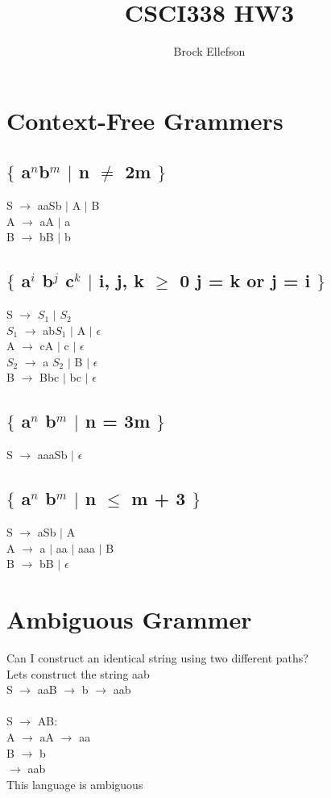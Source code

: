 \documentclass[10pt,a4paper]{article}
\author{Brock Ellefson}
\title{CSCI338 HW3}
\begin{document}
\maketitle

\section{Context-Free Grammers}
\subsection{$\lbrace$ a$^{n}$b$^{m}$ $\mid$ n $\neq$ 2m $\rbrace$}
	S $\rightarrow$ aaSb $\mid$ A $\mid$ B \\
	A $\rightarrow$ aA $\mid$ a \\
	B $\rightarrow$ bB $\mid$ b
	
\subsection{$\lbrace$ a$^{i}$ b$^{j}$ c$^{k}$ $\mid$ i, j, k $\geq$ 0 j = k or j = i $\rbrace$}
	S $\rightarrow$ $S_{1}$ $\mid$ $S_{2}$ \\
	$S_{1}$  $\rightarrow$ ab$S_{1}$ $\mid$ A $\mid$ $\epsilon$ \\
	A $\rightarrow$ cA $\mid$ c $\mid$ $\epsilon$ \\
	$S_{2}$ $\rightarrow$ a $S_{2}$ $\mid$ B $\mid$ $\epsilon$ \\
	B $\rightarrow$ Bbc $\mid$ bc $\mid$ $\epsilon$
	
\subsection{$\lbrace$ a$^{n}$ b$^{m}$ $\mid$ n = 3m $\rbrace$}
	S $\rightarrow$ aaaSb $\mid$ $\epsilon$ \\
	
\subsection{$\lbrace$ a$^{n}$ b$^{m}$ $\mid$ n $\leq$ m + 3 $\rbrace$}	
	S $\rightarrow$ aSb $\mid$ A \\
	A $\rightarrow$ a $\mid$ aa $\mid$ aaa $\mid$ B \\
	B $\rightarrow$ bB  $\mid$ $\epsilon$
	
 
\section{Ambiguous Grammer}
	Can I construct an identical string using two different paths?\\
	Lets construct the string aab\\
	S $\rightarrow$ aaB $\rightarrow$ b $\rightarrow$ aab \\\\
	S $\rightarrow$ AB:\\
	A $\rightarrow$ aA $\rightarrow$ aa\\
	B $\rightarrow$ b\\
	$\rightarrow$ aab\\
	This language is ambiguous
	
\end{document}
